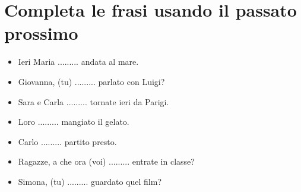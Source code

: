 \documentclass[letter,11pt]{article}
\begin{document}
\vskip 0.2in
\section*{Completa le frasi usando il passato prossimo}

\begin{itemize}
    \item Ieri Maria ......... andata al mare.
    \item Giovanna, (tu) ......... parlato con Luigi?
    \item Sara e Carla ......... tornate ieri da Parigi.
    \item Loro ......... mangiato il gelato.
    \item Carlo ......... partito presto.
    \item Ragazze, a che ora (voi) ......... entrate in classe?
    \item Simona, (tu) ......... guardato quel film?

\end{itemize}

\vskip 0.2in
\end{document}
